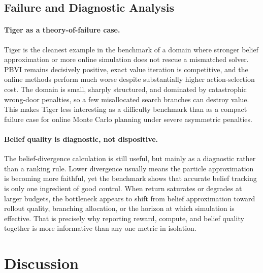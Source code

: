 \documentclass[10pt,twocolumn]{article}
\begin{document}
\subsection{Failure and Diagnostic Analysis}
\paragraph{Tiger as a theory-of-failure case.}
Tiger is the cleanest example in the benchmark of a domain where stronger belief approximation or more online simulation does not rescue a mismatched solver. PBVI remains decisively positive, exact value iteration is competitive, and the online methods perform much worse despite substantially higher action-selection cost. The domain is small, sharply structured, and dominated by catastrophic wrong-door penalties, so a few misallocated search branches can destroy value. This makes Tiger less interesting as a difficulty benchmark than as a compact failure case for online Monte Carlo planning under severe asymmetric penalties.

\paragraph{Belief quality is diagnostic, not dispositive.}
The belief-divergence calculation is still useful, but mainly as a diagnostic rather than a ranking rule. Lower divergence usually means the particle approximation is becoming more faithful, yet the benchmark shows that accurate belief tracking is only one ingredient of good control. When return saturates or degrades at larger budgets, the bottleneck appears to shift from belief approximation toward rollout quality, branching allocation, or the horizon at which simulation is effective. That is precisely why reporting reward, compute, and belief quality together is more informative than any one metric in isolation.

\section{Discussion}
\end{document}
